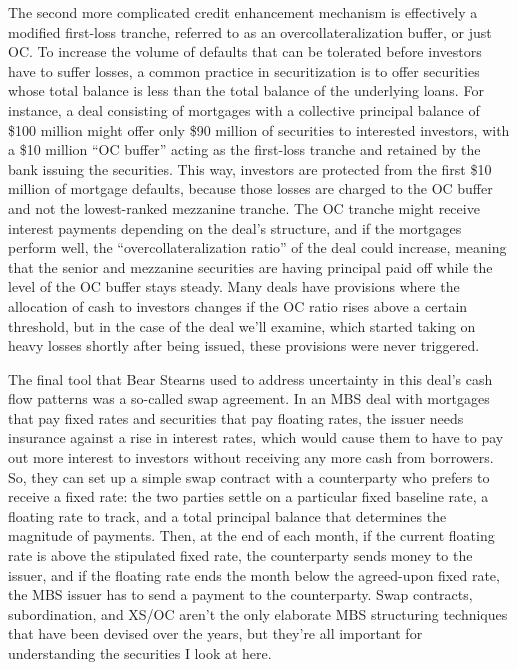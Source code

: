 \documentclass[12pt]{article}
\begin{document}
The second more complicated credit enhancement mechanism is effectively a modified first-loss tranche, referred to as an overcollateralization buffer, or just OC. To increase the volume of defaults that can be tolerated before investors have to suffer losses, a common practice in securitization is to offer securities whose total balance is less than the total balance of the underlying loans. For instance, a deal consisting of mortgages with a collective principal balance of \$100 million might offer only \$90 million of securities to interested investors, with a \$10 million “OC buffer” acting as the first-loss tranche and retained by the bank issuing the securities. This way, investors are protected from the first \$10 million of mortgage defaults, because those losses are charged to the OC buffer and not the lowest-ranked mezzanine tranche. The OC tranche might receive interest payments depending on the deal’s structure, and if the mortgages perform well, the “overcollateralization ratio” of the deal could increase, meaning that the senior and mezzanine securities are having principal paid off while the level of the OC buffer stays steady. Many deals have provisions where the allocation of cash to investors changes if the OC ratio rises above a certain threshold, but in the case of the deal we’ll examine, which started taking on heavy losses shortly after being issued, these provisions were never triggered.
	
	The final tool that Bear Stearns used to address uncertainty in this deal's cash flow patterns was a so-called swap agreement. In an MBS deal with mortgages that pay fixed rates and securities that pay floating rates, the issuer needs insurance against a rise in interest rates, which would cause them to have to pay out more interest to investors without receiving any more cash from borrowers. So, they can set up a simple swap contract with a counterparty who prefers to receive a fixed rate: the two parties settle on a particular fixed baseline rate, a floating rate to track, and a total principal balance that determines the magnitude of payments. Then, at the end of each month, if the current floating rate is above the stipulated fixed rate, the counterparty sends money to the issuer, and if the floating rate ends the month below the agreed-upon fixed rate, the MBS issuer has to send a payment to the counterparty. Swap contracts, subordination, and XS/OC aren’t the only elaborate MBS structuring techniques that have been devised over the years, but they’re all important for understanding the securities I look at here.
\end{document}
